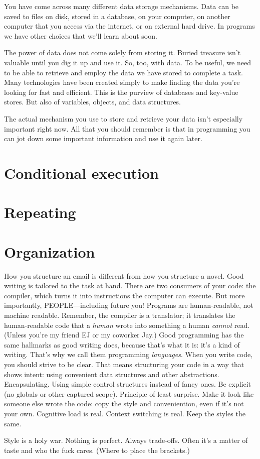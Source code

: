 You have come across many different data storage mechanisms. Data can be saved to files on disk, stored in a database, on your computer, on another computer that you access via the internet, or on external hard drive. In programs we have other choices that we'll learn about soon.

The power of data does not come solely from storing it. Buried treasure isn't valuable until you dig it up and use it. So, too, with data. To be useful, we need to be able to retrieve and employ the data we have stored to complete a task. Many technologies have been created simply to make finding the data you're looking for fast and efficient. This is the purview of databases and key-value stores. But also of variables, objects, and data structures.

The actual mechanism you use to store and retrieve your data isn't especially important right now. All that you should remember is that in programming you can jot down some important information and use it again later.

\section{Conditional execution}
\section{Repeating}
\section{Organization}

How you structure an email is different from how you structure a novel. Good writing is tailored to the task at hand. There are two consumers of your code: the compiler, which turns it into instructions the computer can execute. But more importantly, PEOPLE---including future you! Programs are human-readable, not machine readable. Remember, the compiler is a translator; it translates the human-readable code that a \emph{human} wrote into something a human \emph{cannot} read. (Unless you're my friend EJ or my coworker Jay.) Good programming has the same hallmarks as good writing does, because that's what it is: it's a kind of writing. That's why we call them programming \emph{languages}. When you write code, you should strive to be clear. That means structuring your code in a way that shows intent: using convenient data structures and other abstractions. Encapsulating. Using simple control structures instead of fancy ones. Be explicit (no globals or other captured scope). Principle of least surprise. Make it look like someone else wrote the code: copy the style and conveniention, even if it's not your own. Cognitive load is real. Context switching is real. Keep the styles the same.

Style is a holy war. Nothing is perfect. Always trade-offs. Often it's a matter of taste and who the fuck cares. (Where to place the brackets.)
